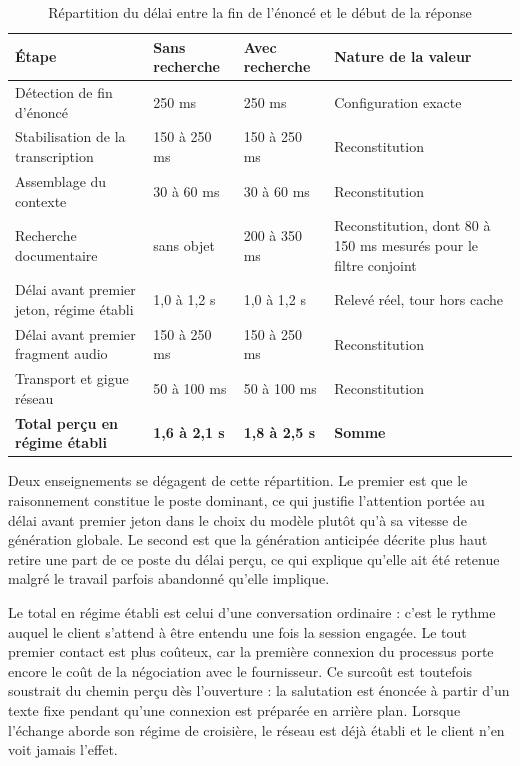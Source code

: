 \begin{table}[H]
\centering
\renewcommand{\arraystretch}{1.2}
\begin{tabular}{|p{5.0cm}|p{2.6cm}|p{2.6cm}|p{3.6cm}|}
\hline
\textbf{Étape} & \textbf{Sans recherche} & \textbf{Avec recherche} & \textbf{Nature de la valeur} \\
\hline
Détection de fin d'énoncé & 250 ms & 250 ms & Configuration exacte \\
\hline
Stabilisation de la transcription & 150 à 250 ms & 150 à 250 ms & Reconstitution \\
\hline
Assemblage du contexte & 30 à 60 ms & 30 à 60 ms & Reconstitution \\
\hline
Recherche documentaire & sans objet & 200 à 350 ms & Reconstitution, dont 80 à 150 ms mesurés pour le filtre conjoint \\
\hline
Délai avant premier jeton, régime établi & 1,0 à 1,2 s & 1,0 à 1,2 s & Relevé réel, tour hors cache \\
\hline
Délai avant premier fragment audio & 150 à 250 ms & 150 à 250 ms & Reconstitution \\
\hline
Transport et gigue réseau & 50 à 100 ms & 50 à 100 ms & Reconstitution \\
\hline
\textbf{Total perçu en régime établi} & \textbf{1,6 à 2,1 s} & \textbf{1,8 à 2,5 s} & \textbf{Somme} \\
\hline
\end{tabular}
\caption{Répartition du délai entre la fin de l'énoncé et le début de la réponse}
\label{tab:budget-latence}
\end{table}

Deux enseignements se dégagent de cette répartition. Le premier est que le raisonnement constitue le poste dominant, ce qui justifie l'attention portée au délai avant premier jeton dans le choix du modèle plutôt qu'à sa vitesse de génération globale. Le second est que la génération anticipée décrite plus haut retire une part de ce poste du délai perçu, ce qui explique qu'elle ait été retenue malgré le travail parfois abandonné qu'elle implique.

Le total en régime établi est celui d'une conversation ordinaire : c'est le rythme auquel le client s'attend à être entendu une fois la session engagée. Le tout premier contact est plus coûteux, car la première connexion du processus porte encore le coût de la négociation avec le fournisseur. Ce surcoût est toutefois soustrait du chemin perçu dès l'ouverture : la salutation est énoncée à partir d'un texte fixe pendant qu'une connexion est préparée en arrière plan. Lorsque l'échange aborde son régime de croisière, le réseau est déjà établi et le client n'en voit jamais l'effet.

